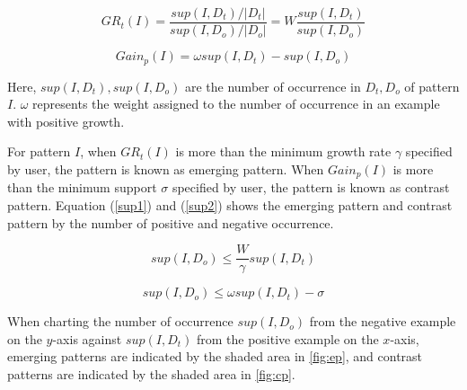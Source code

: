 \begin{equation}
GR_t(I)=\frac{sup(I,D_t)/|D_t|}{sup(I,D_o)/|D_o|}=W\frac{sup(I,D_t)}{sup(I,D_o)} \label{gp}
\end{equation}

\begin{equation}
Gain_p(I)=\omega sup(I,D_t) - sup(I,D_o) \label{gain}
\end{equation}

Here, $sup(I,D_t),sup(I,D_o)$ are the number of occurrence in $D_t,D_o$ of pattern $I$. $\omega$ represents the weight assigned to the number of occurrence in an example with positive growth. 

For pattern $I$, when $GR_t(I)$ is more than the minimum growth rate $\gamma$ specified by user, the pattern is known as emerging pattern. When $Gain_p(I)$ is more than the minimum support $\sigma$ specified by user, the pattern is known as contrast pattern.
Equation (\ref{sup1}) and (\ref{sup2}) shows the emerging pattern and contrast pattern by the number of positive and negative occurrence. 


\begin{equation}
sup(I,D_o)\le \frac{W}{\gamma} sup(I,D_t) \label{sup1}
\end{equation}

\begin{equation}
sup(I,D_o)\le \omega sup(I,D_t) - \sigma \label{sup2}
\end{equation}

When charting the number of occurrence $sup(I,D_o)$ from the negative example on the $y$-axis against $sup(I,D_t)$ from the positive example on the $x$-axis,  emerging patterns are indicated by the shaded area in \ref{fig:ep}, and contrast patterns are indicated by the shaded area in \ref{fig:cp}. 

